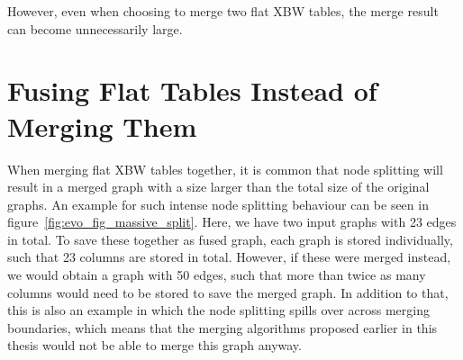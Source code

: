 \documentclass[a4paper,12pt,twoside,BCOR=10mm]{scrbook}
\begin{document}
However, even when choosing to merge two flat XBW tables, 
the merge result can become unnecessarily large.


\section{Fusing Flat Tables Instead of Merging Them}
%

When merging flat XBW tables together, it is common that node splitting 
will result in a merged graph with a size larger than the total size of the 
original graphs. An example for such intense node splitting behaviour can 
be seen in figure~\ref{fig:evo_fig_massive_split}. 
Here, we have two input graphs with 23 edges in total. 
To save these together as fused graph, each graph is stored individually, 
such that 23 columns are stored in total. 
However, if these were merged instead, we would obtain a graph with 50 edges, 
such that more than twice as many columns would need to be stored to save the 
merged graph. 
In addition to that, this is also an example in which the node splitting spills over 
across merging boundaries, which means that the merging algorithms proposed earlier 
in this thesis would not be able to merge this graph anyway.
\end{document}

